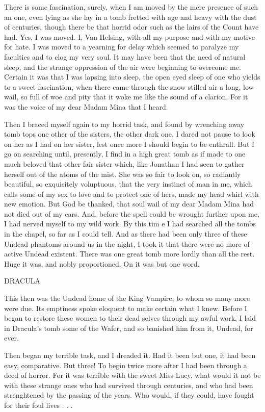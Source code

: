 There is some fascination, surely, when I am moved by the mere presence of such an one, even lying as she lay in a tomb fretted with age and heavy with the dust of centuries, though there be that horrid odor such as the lairs of the Count have had. Yes, I was moved. I, Van Helsing, with all my purpose and with my motive for hate. I was moved to a yearning for delay which seemed to paralyze my faculties and to clog my very soul. It may have been that the need of natural sleep, and the strange oppression of the air were beginning to overcome me. Certain it was that I was lapsing into sleep, the open eyed sleep of one who yields to a sweet fascination, when there came through the snow stilled air a long, low wail, so full of woe and pity that it woke me like the sound of a clarion. For it was the voice of my dear Madam Mina that I heard. 

Then I braced myself again to my horrid task, and found by wrenching away tomb tops one other of the sisters, the other dark one. I dared not pause to look on her as I had on her sister, lest once more I should begin to be enthrall. But I go on searching until, presently, I find in a high great tomb as if made to one much beloved that other fair sister which, like Jonathan I had seen to gather herself out of the atoms of the mist. She was so fair to look on, so radiantly beautiful, so exquisitely voluptuous, that the very instinct of man in me, which calls some of my sex to love and to protect one of hers, made my head whirl with new emotion. But God be thanked, that soul wail of my dear Madam Mina had not died out of my ears. And, before the spell could be wrought further upon me, I had nerved myself to my wild work. By this tim e I had searched all the tombs in the chapel, so far as I could tell. And as there had been only three of these Undead phantoms around us in the night, I took it that there were no more of active Undead existent. There was one great tomb more lordly than all the rest. Huge it was, and nobly proportioned. On it was but one word. 

DRACULA 

This then was the Undead home of the King Vampire, to whom so many more were due. Its emptiness spoke eloquent to make certain what I knew. Before I began to restore these women to their dead selves through my awful work, I laid in Dracula's tomb some of the Wafer, and so banished him from it, Undead, for ever. 

Then began my terrible task, and I dreaded it. Had it been but one, it had been easy, comparative. But three! To begin twice more after I had been through a deed of horror. For it was terrible with the sweet Miss Lucy, what would it not be with these strange ones who had survived through centuries, and who had been strenghtened by the passing of the years. Who would, if they could, have fought for their foul lives . . . 

